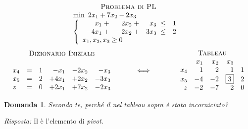 \documentclass[10pt]{article}
\newtheorem{Dom}{Domanda}%
\begin{document}
\[
   \begin{array}{c}
   \mbox{\sc Problema di PL}\\ 
   \begin{array}{l}
        \min \mbox{\ }2x_1 + 7x_2 -2x_3\\
        \left\{
        \begin{array}{l}
        \begin{array}{rrrr}
             x_1 \;+&  2x_2 \;+&  x_3 \;\leq &   1 \\
           -4x_1 \;+& -2x_2 \;+& 3x_3 \;\leq &   2 \\
        \end{array} \\
        x_1, x_2, x_3  \geq 0    
        \end{array}
        \right.
   \end{array}
   \end{array}
\]
\[
   \begin{array}{c}
   \mbox{\sc Dizionario Iniziale}\\ \\
   \begin{array}{lcrrrr}
      x_{4} &=& 1 & -x_1 & -2x_2 & -x_3 \\
      x_{5} &=& 2 & +4x_1 & +2x_2 & -3x_3 \\
         z    &=& 0 & +2x_1 & +7x_2 & -2x_3 \\
   \end{array}
   \end{array}
\hfill
\hspace{1cm}
{\Huge \Longleftrightarrow}
\hfill
\hspace{1.2cm}
   \begin{array}{c}
   \mbox{\sc Tableau}\\ 
   \begin{array}{rrrrr}
         & x_1  & x_2 & x_3  \\
      x_4 &  1 &  2 &  1   &  1 \\
      x_5 & -4 & -2 & \fbox{3} &  2 \\
       z  & -2 & -7 &  2   &  0 \\
   \end{array}
   \end{array}
\]

\begin{Dom}
   Secondo te,
   perch\'e il  nel tableau sopra \`e stato incorniciato?
\end{Dom}
{\em Risposta: \/}
Il  \`e l'elemento di {\em pivot}.\\
\end{document}
